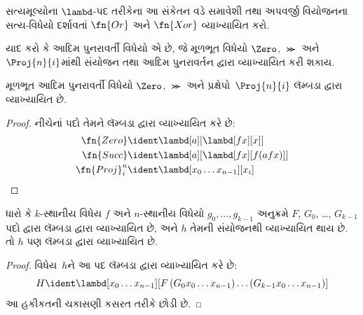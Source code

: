 \begin{prob}
  સત્યમૂલ્યોના $\lambd$-પદ તરીકેના આ સંકેતન
  વડે સમાવેશી તથા અપવર્જી વિયોજનના સત્ય-વિધેયો
  દર્શાવતાં $\fn{Or}$ અને $\fn{Xor}$ વ્યાખ્યાયિત કરો.
\end{prob}
\endgroup

\begingroup
\makeatletter{}\makeatother

\label{guunit:OLP-0378}


યાદ કરો કે આદિમ પુનરાવર્તી વિધેયો એ છે, જે મૂળભૂત
વિધેયો $\Zero$, $\Succ$ અને $\Proj{n}{i}$માંથી
સંયોજન તથા આદિમ પુનરાવર્તન દ્વારા વ્યાખ્યાયિત કરી શકાય.

\begin{lem}
  મૂળભૂત આદિમ પુનરાવર્તી વિધેયો $\Zero$, $\Succ$ અને
  પ્રક્ષેપો~$\Proj{n}{i}$ લૅમ્બડા દ્વારા વ્યાખ્યાયિત છે.
\end{lem}

\begin{proof}
નીચેનાં પદો તેમને લૅમ્બડા દ્વારા વ્યાખ્યાયિત કરે છે:
\begin{align*}
  \fn{Zero} & \ident \lambd[a][\lambd[fx][x]]\\
  \fn{Succ} & \ident \lambd[a][\lambd[fx][f (a f x)]] \\
  \fn{Proj}^n_i & \ident \lambd[x_0\dots x_{n-1}][x_i]
\end{align*}
\end{proof}

\begin{lem}
   ધારો કે $k$-સ્થાનીય વિધેય $f$ અને
  $n$-સ્થાનીય વિધેયો $g_0, \dots, g_{k-1}$ અનુક્રમે
  $F$, $G_0$, \dots, $G_{k-1}$ પદો દ્વારા
  લૅમ્બડા દ્વારા વ્યાખ્યાયિત છે, અને $h$ તેમની
  સંયોજનથી વ્યાખ્યાયિત થાય છે. તો $h$ પણ
  લૅમ્બડા દ્વારા વ્યાખ્યાયિત છે.
\end{lem}

\begin{proof}
  વિધેય~$h$ને આ પદ લૅમ્બડા દ્વારા વ્યાખ્યાયિત કરે છે:
  \[
  H \ident \lambd[x_0 \dots x_{n-1}][F\, (G_0 x_0 \dots
    x_{n-1}) \dots (G_{k-1} x_0 \dots x_{n-1})]
  \]
  આ હકીકતની ચકાસણી કસરત તરીકે છોડી છે.
\end{proof}

